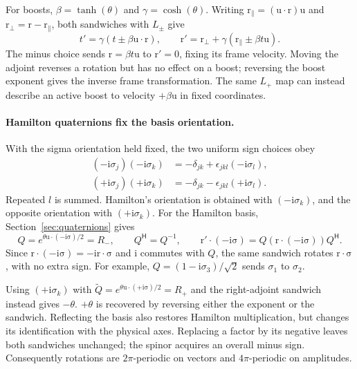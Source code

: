 \documentclass[11pt]{article}
\newcommand{\pv}[1]{{#1}}
\newcommand{\pvGreek}[1]{{#1}}
\newcommand{\vstyle}[1]{{\bm{\mathrm{#1}}}}
\newcommand{\pL}{\pv{L}}
\newcommand{\pQ}{\pv{Q}}
\newcommand{\pR}{\pv{R}}
\newcommand{\pvsigma}{\pvGreek{\sigma}}
\numberwithin{equation}{section}
\newcommand{\ii}{\mathrm{i}}
\newcommand{\dotprod}{\cdot}
\newcommand{\bsig}{\vstyle{\sigma}}
\newcommand{\br}{\vstyle{r}}
\newcommand{\bu}{\vstyle{u}}
\begin{document}
For boosts, $\beta=\tanh(\theta)$ and $\gamma=\cosh(\theta)$.
Writing $\br_\parallel=(\bu\dotprod\br)\bu$ and
$\br_\perp=\br-\br_\parallel$, both sandwiches with $\pL_\pm$ give
\[
 t'=\gamma(t\pm\beta\bu\dotprod\br),\qquad
 \br'=\br_\perp+\gamma(\br_\parallel\pm\beta t\bu).
\]
The minus choice sends $\br=\beta t\bu$ to $\br'=0$, fixing its frame
velocity.  Moving the adjoint reverses a rotation but has no effect on a
boost; reversing the boost exponent gives the inverse frame transformation.
The same $\pL_+$ map can instead describe an active boost to velocity
$+\beta\bu$ in fixed coordinates.

\paragraph{Hamilton quaternions fix the basis orientation.}
With the sigma orientation held fixed, the two uniform sign choices obey
\[
 \begin{aligned}
 (-\ii\pvsigma_j)(-\ii\pvsigma_k)&=-\delta_{jk}+\epsilon_{jkl}(-\ii\pvsigma_l),\\
 (+\ii\pvsigma_j)(+\ii\pvsigma_k)&=-\delta_{jk}-\epsilon_{jkl}(+\ii\pvsigma_l).
 \end{aligned}
\]
Repeated $l$ is summed. Hamilton's orientation is obtained with
$(-\ii\pvsigma_k)$, and the opposite orientation with $(+\ii\pvsigma_k)$.
For the Hamilton basis, Section~\ref{sec:quaternions} gives
\[
 \pQ=e^{\theta\bu\dotprod(-\ii\bsig)/2}=\pR_-,\qquad
 \pQ^{\mathsf H}=\pQ^{-1},\qquad
 \br'\dotprod(-\ii\bsig)=\pQ(\br\dotprod(-\ii\bsig))\pQ^{\mathsf H}.
\]
Since $\br\dotprod(-\ii\bsig)=-\ii\br\dotprod\bsig$ and $\ii$ commutes with $\pQ$,
the same sandwich rotates $\br\dotprod\bsig$, with no extra sign.
For example, $\pQ=(1-\ii\pvsigma_3)/\sqrt2$ sends $\pvsigma_1$ to $\pvsigma_2$.

Using $(+\ii\pvsigma_k)$ with
$\widetilde {\pQ}=e^{\theta\bu\dotprod(+\ii\bsig)/2}=\pR_+$ and the right-adjoint
sandwich instead gives $-\theta$.  $+\theta$ is recovered by reversing either
the exponent or the sandwich.  Reflecting the basis also restores Hamilton
multiplication, but changes its identification with the physical axes.
Replacing a factor by its negative leaves both sandwiches unchanged;
the spinor acquires an overall minus sign.  Consequently rotations are
$2\pi$-periodic on vectors and $4\pi$-periodic on amplitudes.
\end{document}
